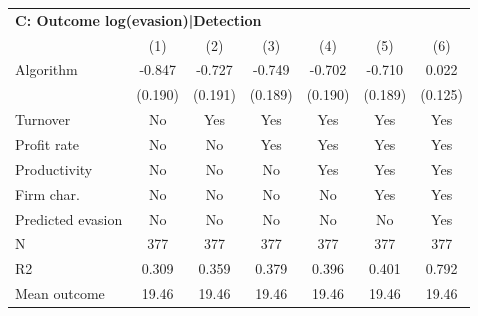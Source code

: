 \begin{tabular}{lcccccc}
\midrule \multicolumn{7}{l}{\textbf{C: Outcome log(evasion)|Detection}} \\ \multicolumn{1}{l}{} & (1) & (2) & (3) & (4) & (5) & (6) \\ \midrule
Algorithm   &      -0.847\sym{***}&      -0.727\sym{***}&      -0.749\sym{***}&      -0.702\sym{***}&      -0.710\sym{***}&       0.022         \\
            &     (0.190)         &     (0.191)         &     (0.189)         &     (0.190)         &     (0.189)         &     (0.125)         \\
\midrule
Turnover    &          No         &         Yes         &         Yes         &         Yes         &         Yes         &         Yes         \\
Profit rate &          No         &          No         &         Yes         &         Yes         &         Yes         &         Yes         \\
Productivity&          No         &          No         &          No         &         Yes         &         Yes         &         Yes         \\
Firm char.  &          No         &          No         &          No         &          No         &         Yes         &         Yes         \\
Predicted evasion&          No         &          No         &          No         &          No         &          No         &         Yes         \\
N           &         377         &         377         &         377         &         377         &         377         &         377         \\
R2          &       0.309         &       0.359         &       0.379         &       0.396         &       0.401         &       0.792         \\
Mean outcome&       19.46         &       19.46         &       19.46         &       19.46         &       19.46         &       19.46         \\
\bottomrule \end{tabular}
